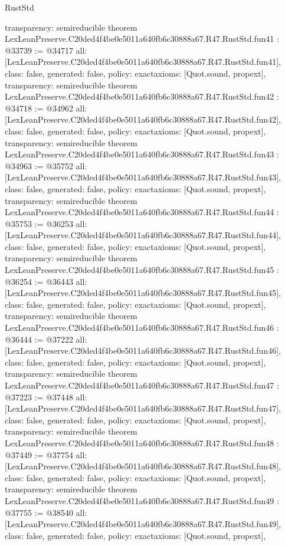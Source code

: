 \begin{lexlean}{RustStd}
\begin{coremodule}
{  transparency: semireducible
}
theorem LexLeanPreserve.C20ded4f4be0e5011a640fb6c30888a67.R47.RustStd.fun41 : @33739 := @34717 {
  all: [LexLeanPreserve.C20ded4f4be0e5011a640fb6c30888a67.R47.RustStd.fun41],
  class: false,
  generated: false,
  policy: exact{axioms: [Quot.sound, propext]},
  transparency: semireducible
}
theorem LexLeanPreserve.C20ded4f4be0e5011a640fb6c30888a67.R47.RustStd.fun42 : @34718 := @34962 {
  all: [LexLeanPreserve.C20ded4f4be0e5011a640fb6c30888a67.R47.RustStd.fun42],
  class: false,
  generated: false,
  policy: exact{axioms: [Quot.sound, propext]},
  transparency: semireducible
}
theorem LexLeanPreserve.C20ded4f4be0e5011a640fb6c30888a67.R47.RustStd.fun43 : @34963 := @35752 {
  all: [LexLeanPreserve.C20ded4f4be0e5011a640fb6c30888a67.R47.RustStd.fun43],
  class: false,
  generated: false,
  policy: exact{axioms: [Quot.sound, propext]},
  transparency: semireducible
}
theorem LexLeanPreserve.C20ded4f4be0e5011a640fb6c30888a67.R47.RustStd.fun44 : @35753 := @36253 {
  all: [LexLeanPreserve.C20ded4f4be0e5011a640fb6c30888a67.R47.RustStd.fun44],
  class: false,
  generated: false,
  policy: exact{axioms: [Quot.sound, propext]},
  transparency: semireducible
}
theorem LexLeanPreserve.C20ded4f4be0e5011a640fb6c30888a67.R47.RustStd.fun45 : @36254 := @36443 {
  all: [LexLeanPreserve.C20ded4f4be0e5011a640fb6c30888a67.R47.RustStd.fun45],
  class: false,
  generated: false,
  policy: exact{axioms: [Quot.sound, propext]},
  transparency: semireducible
}
theorem LexLeanPreserve.C20ded4f4be0e5011a640fb6c30888a67.R47.RustStd.fun46 : @36444 := @37222 {
  all: [LexLeanPreserve.C20ded4f4be0e5011a640fb6c30888a67.R47.RustStd.fun46],
  class: false,
  generated: false,
  policy: exact{axioms: [Quot.sound, propext]},
  transparency: semireducible
}
theorem LexLeanPreserve.C20ded4f4be0e5011a640fb6c30888a67.R47.RustStd.fun47 : @37223 := @37448 {
  all: [LexLeanPreserve.C20ded4f4be0e5011a640fb6c30888a67.R47.RustStd.fun47],
  class: false,
  generated: false,
  policy: exact{axioms: [Quot.sound, propext]},
  transparency: semireducible
}
theorem LexLeanPreserve.C20ded4f4be0e5011a640fb6c30888a67.R47.RustStd.fun48 : @37449 := @37754 {
  all: [LexLeanPreserve.C20ded4f4be0e5011a640fb6c30888a67.R47.RustStd.fun48],
  class: false,
  generated: false,
  policy: exact{axioms: [Quot.sound, propext]},
  transparency: semireducible
}
theorem LexLeanPreserve.C20ded4f4be0e5011a640fb6c30888a67.R47.RustStd.fun49 : @37755 := @38540 {
  all: [LexLeanPreserve.C20ded4f4be0e5011a640fb6c30888a67.R47.RustStd.fun49],
  class: false,
  generated: false,
  policy: exact{axioms: [Quot.sound, propext]},
}
\end{coremodule}
\end{lexlean}
